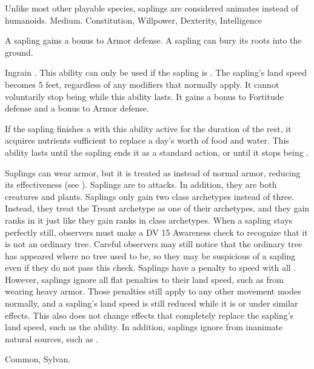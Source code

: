    Unlike most other playable species, saplings are considered animates instead of humanoids.
   Medium.
    Constitution,  Willpower,  Dexterity,  Intelligence
  \begin{itemize}
     A sapling gains a  bonus to Armor defense.
     A sapling can bury its roots into the ground.
      \begin{activeability}{Ingrain}
        \abilityusagetime {}.
        \rankline
        This ability can only be used if the sapling is .
        The sapling's land speed becomes 5 feet, regardless of any modifiers that normally apply.
        It cannot voluntarily stop being  while this ability lasts.
        It gains a  bonus to Fortitude defense and a  bonus to Armor defense.

        If the sapling finishes a  with this ability active for the duration of the rest, it acquires nutrients sufficient to replace a day's worth of food and water.
        This ability lasts until the sapling ends it as a standard action, or until it stops being .
      \end{activeability}
     Saplings can wear armor, but it is treated as  instead of normal armor, reducing its effectiveness (see ).
     Saplings are \vulnerable to \atFire attacks. In addition, they are both creatures and plants.
     Saplings only gain two class archetypes instead of three.
      Instead, they treat the Treant archetype as one of their archetypes, and they gain ranks in it just like they gain ranks in class archetypes.
     When a sapling stays perfectly still, observers must make a DV 15 Awareness check to recognize that it is not an ordinary tree.
      Careful observers may still notice that the ordinary tree has appeared where no tree used to be, so they may be suspicious of a sapling even if they do not pass this check.
     Saplings have a  penalty to speed with all .
      However, saplings ignore all flat penalties to their land speed, such as from wearing heavy armor.
      Those penalties still apply to any other movement modes normally, and a sapling's land speed is still reduced while it is \slowed or under similar effects.
      This also does not change effects that completely replace the sapling's land speed, such as the  ability.
      In addition, saplings ignore  from inanimate natural sources, such as .
  \end{itemize}
   Common, Sylvan.

